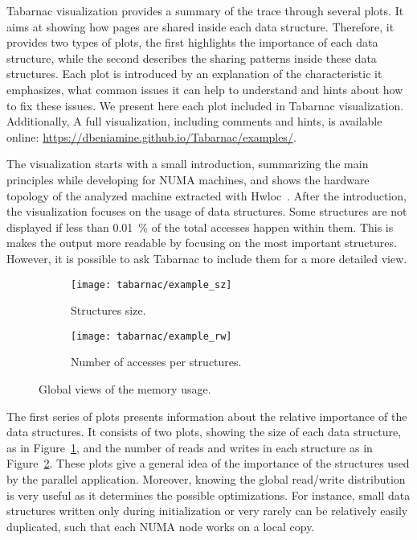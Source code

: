 \gls{Tabarnac} visualization provides a summary of the trace through several plots.
It aims at showing how pages are shared inside each data structure.
Therefore, it provides two types of plots, the first highlights the importance of each data structure, while the second describes the sharing patterns inside these data structures.
Each plot is introduced by an explanation of the characteristic it emphasizes, what common issues it can help to understand and hints about how to fix these issues.
We present here each plot included in \gls{Tabarnac} visualization.
Additionally, A full visualization, including comments and hints, is available online: \url{https://dbeniamine.github.io/Tabarnac/examples/}.

The visualization starts with a small introduction, summarizing the main principles while developing for \gls{NUMA} machines, and shows the hardware topology of the analyzed machine extracted
with Hwloc~\cite{Broquedis10hwloc}.
After the introduction, the visualization focuses on the usage of data structures.
Some structures are not displayed if less than \SI{0.01}{\%} of the total accesses happen within them.
This is makes the output more readable by focusing on the most important structures.
However, it is possible to ask \gls{Tabarnac} to include them for a more detailed view.

\begin{figure}[htb]
    \centering
    \begin{subfigure}{.49\linewidth}
        \texttt{[image: tabarnac/example\_sz]}
        \caption{Structures size.}
        \label{fig:example_sz}
    \end{subfigure}
    \begin{subfigure}{.49\linewidth}
        \texttt{[image: tabarnac/example\_rw]}
        \caption{Number of accesses per structures.}
        \label{fig:example_rw}
    \end{subfigure}
    \caption{Global views of the memory usage.}
    \label{fig:example_plot1}
\end{figure}

The first series of plots presents information about the relative importance of the data structures.
It consists of two plots, showing the size of each data structure, as in Figure~\ref{fig:example_sz}, and the number of reads and writes in each structure as in Figure~\ref{fig:example_rw}.
These plots give a general idea of the importance of the structures used by the parallel application.
Moreover, knowing the global read/write distribution is very useful as it determines the possible optimizations.
For instance, small data structures written only during initialization or very rarely can be relatively easily
duplicated, such that each \gls{NUMA} node works on a local copy.

